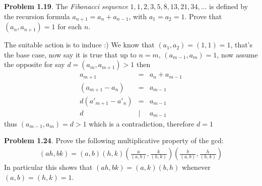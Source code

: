 \documentclass[aps,preprint,preprintnumbers,nofootinbib,showpacs,prd]{revtex4-1}
\newcommand{\nbea}{\begin{eqnarray*}}
\newcommand{\neea}{\end{eqnarray*}}
\begin{document}
{\bf Problem 1.19}. The {\it Fibonacci sequence} $1,1,2,3,5,8,13,21,34,\dots$ is defined by the recursion formula $a_{n+1} = a_n + a_{n-1}$, with $a_1 = a_2 = 1$. Prove that $(a_n,a_{n+1})=1$ for each $n$.

The suitable action is to induce :) We know that $(a_1,a_2) = (1,1) = 1$, that's the base case, now say it is true that up to $n = m$, $(a_{m-1},a_m)=1$, now assume the opposite for say $d = (a_m,a_{m+1}) > 1$ then
%
\nbea
a_{m+1} & = & a_n + a_{m-1} \\
(a_{m+1} - a_n) & = &  a_{m-1} \\
d(a'_{m+1} - a'_n) & = &  a_{m-1} \\
d &|& a_{m-1}
\neea
%
thus $(a_{m-1},a_m) = d > 1$ which is a contradiction, therefore $d=1$

{\bf Problem 1.24}. Prove the following multiplicative property of the gcd:
%
\nbea
(ah,bk) = (a,b)(h,k)\left ( \frac{a}{(a,b)},\frac{k}{(h,k)}\right )\left ( \frac{b}{(a,b)},\frac{h}{(h,k)}\right )
\neea
%
In particular this shows that $(ah,bk) = (a,k)(b,h)$ whenever $(a,b)=(h,k)=1$.
\end{document}
